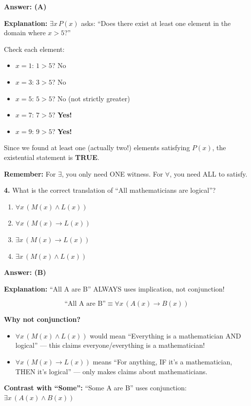 \documentclass[11pt,a4paper]{article}
\begin{document}
\begin{solnbox}
\textbf{Answer: (A)}

\textbf{Explanation:} $\exists x\, P(x)$ asks: ``Does there exist at least one element in the domain where $x > 5$?''

Check each element:
\begin{itemize}[noitemsep]
    \item $x = 1$: $1 > 5$? No
    \item $x = 3$: $3 > 5$? No
    \item $x = 5$: $5 > 5$? No (not strictly greater)
    \item $x = 7$: $7 > 5$? \textbf{Yes!}
    \item $x = 9$: $9 > 5$? \textbf{Yes!}
\end{itemize}

Since we found at least one (actually two!) elements satisfying $P(x)$, the existential statement is \textbf{TRUE}.

\textbf{Remember:} For $\exists$, you only need ONE witness. For $\forall$, you need ALL to satisfy.
\end{solnbox}

\vspace{10pt}

\textbf{4.} What is the correct translation of ``All mathematicians are logical''?

\begin{enumerate}[label=(\Alph*),noitemsep]
    \item $\forall x\, (M(x) \land L(x))$
    \item $\forall x\, (M(x) \to L(x))$
    \item $\exists x\, (M(x) \to L(x))$
    \item $\exists x\, (M(x) \land L(x))$
\end{enumerate}

\begin{solnbox}
\textbf{Answer: (B)}

\textbf{Explanation:} ``All A are B'' ALWAYS uses implication, not conjunction!

$$\text{``All A are B''} \equiv \forall x\, (A(x) \to B(x))$$

\textbf{Why not conjunction?}
\begin{itemize}[noitemsep]
    \item $\forall x\, (M(x) \land L(x))$ would mean ``Everything is a mathematician AND logical'' --- this claims everyone/everything is a mathematician!
    \item $\forall x\, (M(x) \to L(x))$ means ``For anything, IF it's a mathematician, THEN it's logical'' --- only makes claims about mathematicians.
\end{itemize}

\textbf{Contrast with ``Some'':} ``Some A are B'' uses conjunction: $\exists x\, (A(x) \land B(x))$
\end{solnbox}
\end{document}
